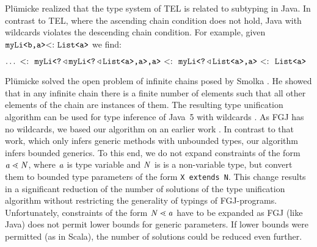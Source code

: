 Pl\"umicke \cite{plue09_1} realized that the type system of
\textsf{TEL} is related to subtyping in Java.
In contrast to \textsf{TEL}, where the ascending chain condition does
not hold,  Java with wildcards violates the descending chain
condition. For example, given $\texttt{myLi}\textrm{{\tt <b,a}}\textrm{{\tt >}} \textrm{$<:$}\ 
\texttt{List}\textrm{{\tt <a}}\textrm{{\tt >}}$ we find:

\smallskip
{\centering
$\ldots \ \olsub\
\exptypett{myLi}{\exptypett{?\,$\extends$\,myLi}{\exptypett{\textrm{{\tt ?}}\,$\extends$\,List}{a},a},a}
\ \olsub\ \exptypett{myLi}{\exptypett{?\,$\extends$\,List}{a},a} \ \olsub\  \exptypett{List}{a}$\\}

\smallskip
Pl\"umicke \cite{plue09_1} solved the open problem of infinite chains
posed by Smolka \cite{GS89}.
He showed that in any infinite chain there is a finite number of elements such that
all other elements of the chain are instances of them. The resulting type
unification algorithm can be used for type inference of Java~5 with
wildcards \cite{Plue07_3}. As FGJ has no wildcards, we based our
algorithm on an earlier work \cite{Plue04_1}.
In contrast to that work, which only infers generic methods with
unbounded types, our algorithm  infers bounded generics.
To this end, we do not expand constraints
of the form $\mathit{ a } \lessdot \mathit{N}$, where $\mathit{ a }$ is type variable and $\mathit{N}$ is is a
non-variable type, but convert them to bounded type parameters of the form
\texttt{X extends N}. This change results in a significant reduction
of the number of solutions of the type
unification algorithm without restricting the generality of typings of
FGJ-programs. Unfortunately, constraints of the form $\mathit{N} \lessdot \mathit{ a }$ have
to be expanded as FGJ (like Java) does not permit lower bounds for
generic parameters. If lower bounds were permitted  (as in Scala), the
number of solutions could be reduced even further.



